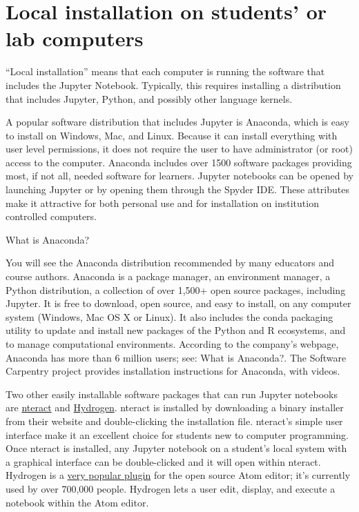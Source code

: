 \documentclass[]{book}
\let\BeginKnitrBlock\begin \let\EndKnitrBlock\end
\begin{document}
\section{Local installation on students' or lab
computers}\label{local-installation-on-students-or-lab-computers}

``Local installation'' means that each computer is running the software
that includes the Jupyter Notebook. Typically, this requires installing
a distribution that includes Jupyter, Python, and possibly other
language kernels.

A popular software distribution that includes Jupyter is Anaconda, which
is easy to install on Windows, Mac, and Linux. Because it can install
everything with user level permissions, it does not require the user to
have administrator (or root) access to the computer. Anaconda includes
over 1500 software packages providing most, if not all, needed software
for learners. Jupyter notebooks can be opened by launching Jupyter or by
opening them through the Spyder IDE. These attributes make it attractive
for both personal use and for installation on institution controlled
computers.

\BeginKnitrBlock{rmdnote}
What is Anaconda?

You will see the Anaconda distribution recommended by many educators and
course authors. Anaconda is a package manager, an environment manager, a
Python distribution, a collection of over 1,500+ open source packages,
including Jupyter. It is free to download, open source, and easy to
install, on any computer system (Windows, Mac OS X or Linux). It also
includes the conda packaging utility to update and install new packages
of the Python and R ecosystems, and to manage computational
environments. According to the company's webpage, Anaconda has more than
6 million users; see: What is Anaconda?. The Software Carpentry project
provides installation instructions for Anaconda, with videos.
\EndKnitrBlock{rmdnote}

Two other easily installable software packages that can run Jupyter
notebooks are \href{https://nteract.io/}{nteract} and
\href{https://nteract.io/atom}{Hydrogen}. nteract is installed by
downloading a binary installer from their website and double-clicking
the installation file. nteract's simple user interface make it an
excellent choice for students new to computer programming. Once nteract
is installed, any Jupyter notebook on a student's local system with a
graphical interface can be double-clicked and it will open within
nteract. Hydrogen is a \href{https://atom.io/packages/hydrogen}{very
popular plugin} for the open source Atom editor; it's currently used by
over 700,000 people. Hydrogen lets a user edit, display, and execute a
notebook within the Atom editor.
\end{document}
